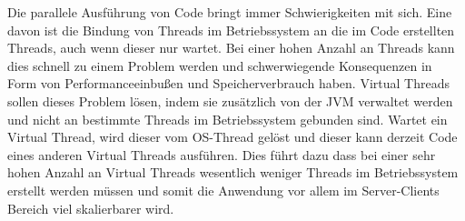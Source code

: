 


Die parallele Ausführung von Code bringt immer Schwierigkeiten mit sich. 
Eine davon ist die Bindung von Threads im Betriebssystem an die im Code erstellten Threads, auch wenn dieser nur wartet. Bei einer hohen Anzahl an Threads kann dies schnell zu einem Problem werden und 
schwerwiegende Konsequenzen in Form von Performanceeinbußen und Speicherverbrauch haben.
Virtual Threads \cite{oracle21VritualThreads} sollen dieses Problem lösen, indem sie zusätzlich von der JVM verwaltet werden und nicht an bestimmte Threads im Betriebssystem gebunden sind.
Wartet ein Virtual Thread, wird dieser vom OS-Thread gelöst und dieser kann derzeit Code eines anderen Virtual Threads ausführen.
Dies führt dazu dass bei einer sehr hohen Anzahl an Virtual Threads wesentlich weniger Threads im Betriebssystem erstellt werden müssen und somit die Anwendung vor allem im Server-Clients Bereich
viel skalierbarer wird.


